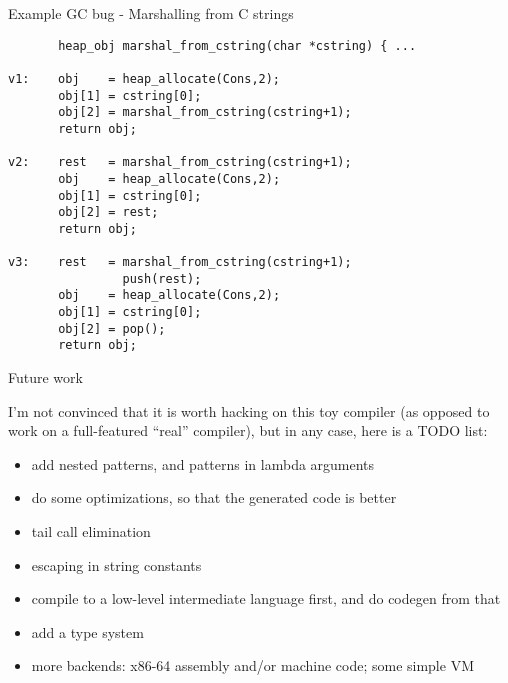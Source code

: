 \documentclass{beamer}
\begin{document}

\begin{frame}[fragile]{Example GC bug - Marshalling from C strings}

{\footnotesize
\begin{verbatim}
       heap_obj marshal_from_cstring(char *cstring) { ...
       
v1:    obj    = heap_allocate(Cons,2);
       obj[1] = cstring[0];
       obj[2] = marshal_from_cstring(cstring+1);
       return obj;
       
v2:    rest   = marshal_from_cstring(cstring+1);
       obj    = heap_allocate(Cons,2);
       obj[1] = cstring[0];
       obj[2] = rest;
       return obj;
       
v3:    rest   = marshal_from_cstring(cstring+1);
                push(rest);
       obj    = heap_allocate(Cons,2);
       obj[1] = cstring[0];
       obj[2] = pop();
       return obj;
\end{verbatim}
}

\end{frame}


\begin{frame}{Future work}

I'm not convinced that it is worth hacking on this toy compiler (as opposed to work
on a full-featured ``real'' compiler), but in any case, here is a TODO list:\\[10pt]

\begin{itemize}
\item add nested patterns, and patterns in lambda arguments
\item do some optimizations, so that the generated code is better
\item tail call elimination
\item escaping in string constants
\item compile to a low-level intermediate language first, and do codegen from that
\item add a type system
\item more backends: x86-64 assembly and/or machine code; some simple VM
\end{itemize}

\end{frame}


\end{document}
